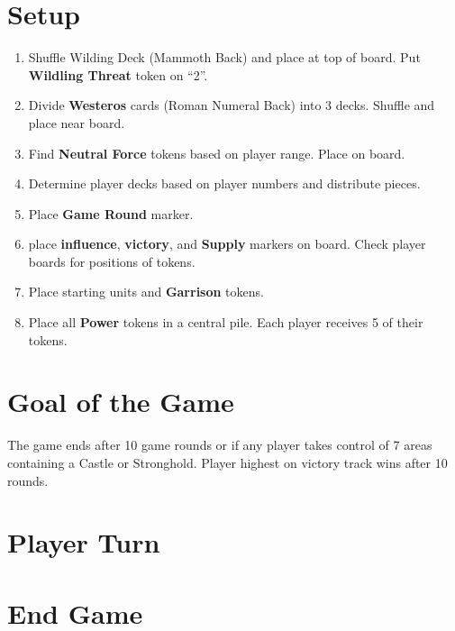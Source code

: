 \documentclass[12pt]{article}
\newenvironment{enumerateCustom}
{\begin{enumerate}
  \setlength{\itemsep}{1pt}
  \setlength{\parskip}{0pt}
  \setlength{\parsep}{0pt}}
{\end{enumerate}}
\begin{document}
\begin{mdframed}[style = customFrame]
\begin{multicols*}{2}

\section*{Setup}
\begin{enumerateCustom}
	\item Shuffle Wilding Deck (Mammoth Back) and place at top of board. Put \textbf{Wildling Threat} token on ``2''.
	\item Divide \textbf{Westeros} cards (Roman Numeral Back) into 3 decks. Shuffle and place near board.
	\item Find \textbf{Neutral Force} tokens based on player range. Place on board.
	\item Determine player decks based on player numbers and distribute pieces.
	\item Place \textbf{Game Round} marker.
	\item place \textbf{influence}, \textbf{victory}, and \textbf{Supply} markers on board. Check player boards for positions of tokens.
	\item Place starting units and \textbf{Garrison} tokens.
	\item Place all \textbf{Power} tokens in a central pile. Each player receives 5 of their tokens.
\end{enumerateCustom}

\section*{Goal of the Game}
The game ends after 10 game rounds or if any player takes control of 7 areas containing a Castle or Stronghold. Player highest on victory track wins after 10 rounds.

\section*{Player Turn}
\section*{End Game}

\end{multicols*}
\end{mdframed}
\end{document}
